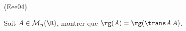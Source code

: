 \begin{tiny}(Eee04)\end{tiny}
Soit $A\in \mathcal{M}_n(\R)$, montrer que $\rg(A) = \rg(\trans A\, A)$.
